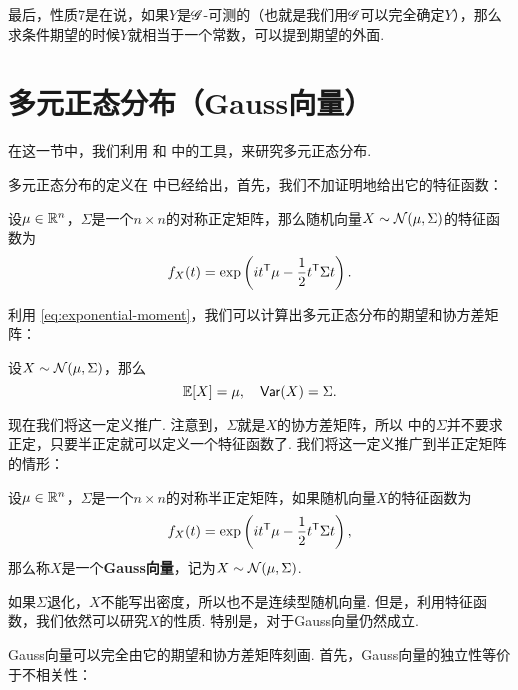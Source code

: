 最后，性质7是在说，如果$Y$是$\mathscr{G}$-可测的（也就是我们用$\mathscr{G}$可以完全确定$Y$），那么求条件期望的时候$Y$就相当于一个常数，可以提到期望的外面. 

\section{多元正态分布（Gauss向量）}\label{sec:multivariate-normal}

在这一节中，我们利用 和 中的工具，来研究多元正态分布.

多元正态分布的定义在 中已经给出，首先，我们不加证明地给出它的特征函数：

\begin{theorem}\label{thm:multivariate-normal-characteristic-function}
设$\mu\in\mathbb{R}^n$，$\Sigma$是一个$n\times n$的对称正定矩阵，那么随机向量$X\sim\mathcal{N}(\mu,\Sigma)$的特征函数为
\[f_X(t)=\exp\left(it^{\mathsf{T}}\mu-\frac{1}{2}t^{\mathsf{T}}\Sigma t\right).\]
\end{theorem}

利用 \eqref{eq:exponential-moment}，我们可以计算出多元正态分布的期望和协方差矩阵：

\begin{proposition}\label{prop:multivariate-normal-expectation-covariance}
设$X\sim\mathcal{N}(\mu,\Sigma)$，那么
\[\mathbb{E}[X]=\mu,\quad\mathsf{Var}(X)=\Sigma.\]
\end{proposition}

现在我们将这一定义推广. 注意到，$\Sigma$就是$X$的协方差矩阵，所以 中的$\Sigma$并不要求正定，只要半正定就可以定义一个特征函数了. 我们将这一定义推广到半正定矩阵的情形：

\begin{definition}[Gauss向量]\label{def:gauss-vector}
设$\mu\in\mathbb{R}^n$，$\Sigma$是一个$n\times n$的对称半正定矩阵，如果随机向量$X$的特征函数为
\[f_X(t)=\exp\left(it^{\mathsf{T}}\mu-\frac{1}{2}t^{\mathsf{T}}\Sigma t\right),\]
那么称$X$是一个\textbf{Gauss向量}，记为$X\sim\mathcal{N}(\mu,\Sigma)$.
\end{definition}

如果$\Sigma$退化，$X$不能写出密度，所以也不是连续型随机向量. 但是，利用特征函数，我们依然可以研究$X$的性质. 特别是，对于Gauss向量仍然成立. 

Gauss向量可以完全由它的期望和协方差矩阵刻画. 首先，Gauss向量的独立性等价于不相关性：

